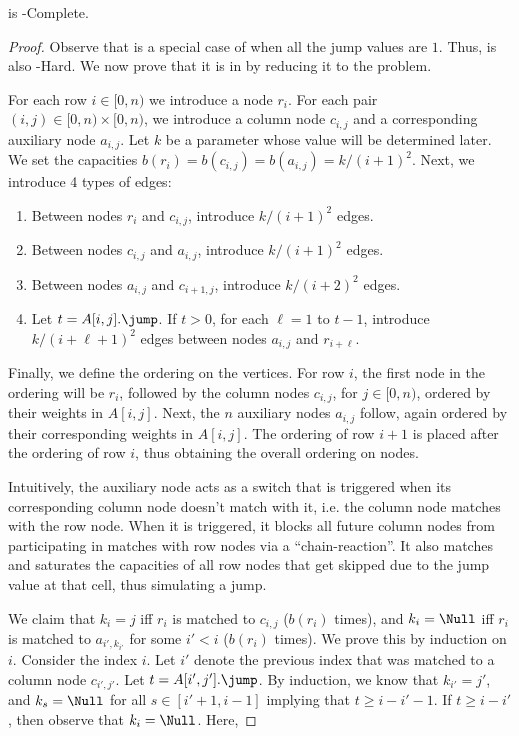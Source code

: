 \begin{lemma}
    \amj is \CC-Complete.
\end{lemma}
\begin{proof}
    Observe that \am is a special case of \amj when all the jump values are $1$. Thus, \amj is also \CC-Hard. We now prove that it is in \CC by reducing it to the \lfbm problem. 
    
    For each row $i \in [0,n)$ we introduce a node $r_i$. For each pair $(i,j) \in [0,n)\times[0,n)$, we introduce a column node $c_{i,j}$ and a corresponding auxiliary node $a_{i,j}$. Let $k$ be a parameter whose value will be determined later. We set the capacities $b(r_i) = b(c_{i,j}) = b(a_{i,j}) = k/{(i+1)^2}$. Next, we introduce 4 types of edges: 
    \begin{enumerate}[label=(\roman*)]
        \item Between nodes $r_i$ and $c_{i,j}$, introduce $k/(i+1)^2$ edges.
        \item Between nodes $c_{i,j}$ and $a_{i,j}$, introduce $k/(i+1)^2$ edges.
        \item Between nodes $a_{i,j}$ and $c_{i+1,j}$, introduce $k/(i+2)^2$ edges.
        \item Let $t = A[i,j].\jump$. If $t>0$, for each $\ell=1$ to $t-1$, introduce $k/(i+\ell+1)^2$ edges between nodes $a_{i,j}$ and $r_{i+\ell}$.
    \end{enumerate}
    Finally, we define the ordering on the vertices. For row $i$, the first node in the ordering will be $r_i$, followed by the column nodes $c_{i,j}$, for $j\in [0,n)$, ordered by their weights in $A[i,j]$. Next, the $n$ auxiliary nodes $a_{i,j}$ follow, again ordered by their corresponding weights in $A[i,j]$. The ordering of row $i+1$ is placed after the ordering of row $i$, thus obtaining the overall ordering on nodes.

    Intuitively, the auxiliary node acts as a switch that is triggered when its corresponding column node doesn't match with it, i.e. the column node matches with the row node. When it is triggered, it blocks all future column nodes from participating in matches with row nodes via a ``chain-reaction''. It also matches and saturates the capacities of all row nodes that get skipped due to the jump value at that cell, thus simulating a jump.

    We claim that $k_i = j$ iff $r_i$ is matched to $c_{i,j}$ ($b(r_i)$ times), and $k_i = \Null$ iff $r_i$ is matched to $a_{i',k_{i'}}$ for some $i'<i$ ($b(r_i)$ times). We prove this by induction on $i$. Consider the index $i$. Let $i'$ denote the previous index that was matched to a column node $c_{i',j'}$. Let $t = A[i',j'].\jump$. By induction, we know that $k_{i'}=j'$, and $k_{s} = \Null$ for all $s \in [i'+1,i-1]$ implying that $t \ge i-i'-1$. If $t \ge i-i'$, then observe that $k_i=\Null$. Here, 



\end{proof}


